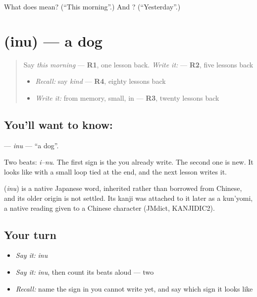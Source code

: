 \begin{tcolorbox}[breakable,colback=teal!4,colframe=teal!35!black,title={Before you move on}]
What does  mean? (\textquotedblleft{}This morning\textquotedblright{}.) And ? (\textquotedblleft{}Yesterday\textquotedblright{}.)
\end{tcolorbox}
\section[\texorpdfstring{\ja{いぬ} (inu)}{いぬ (inu)}]{ (inu) — a dog}

\label{lesson:JA-C133-inu}



\begin{quote}
Say \emph{this morning} — \textbf{R1}, one lesson back. \emph{Write it:} \textbf{} — \textbf{R2}, five lessons back

\begin{itemize}
\raggedright
  \item \emph{Recall:} say \emph{kind} — \textbf{R4}, eighty lessons back
  \item \emph{Write it:} \textbf{} from memory, small, in \textbf{} — \textbf{R3}, twenty lessons back
\end{itemize}
\end{quote}

\subsection*{You'll want to know: }
\textbf{} — \emph{inu} — \textquotedblleft{}a dog\textquotedblright{}.

Two beats: \emph{i–nu}. The first sign is the \textbf{} you already write. The second one is new. It looks like \textbf{} with a small loop tied at the end, and the next lesson writes it.

\begin{cousinweb}
\textbf{} (\emph{inu}) is a native Japanese word, inherited rather than borrowed from Chinese, and its older origin is not settled. Its kanji was attached to it later as a kun'yomi, a native reading given to a Chinese character (JMdict, KANJIDIC2).
\end{cousinweb}

\subsection*{Your turn}
\begin{itemize}
\raggedright
  \item \emph{Say it:} \emph{inu}
  \item \emph{Say it:} \emph{inu}, then count its beats aloud — two
  \item \emph{Recall:} name the sign in \textbf{} you cannot write yet, and say which sign it looks like
\end{itemize}

